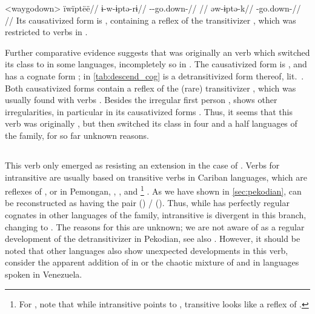 \pex<waygodown>\wayana \parencite[][200]{wayanatavares2005}
\begingl
\glpreamble ïwïptëë//
\gla ɨ-w-ɨptə-rɨ//
\glb {}--go.down-//
\glft {}//
\endgl
{}
\begingl
\gla əw-ɨptə-k//
\glb {}-go.down-//
\glft {}//
\endgl
\xe
%
Its causativized form is  \parencite[255]{wayanatavares2005}, containing a reflex of the transitivizer , which was restricted to  verbs in \PC \parencite{gildea2019overview}.

Further comparative evidence suggests that   was originally an  verb which switched its class to  in some languages, incompletely so in \wayana.
The \arara causativized form is  \parencite[66]{alves2017arara}, and \kalina has a cognate form  \parencite[263]{courtz2008carib};   in \cref{tab:descend_cog} is a detransitivized form thereof, lit.\ .
Both causativized forms contain a reflex of the (rare) transitivizer , which was usually found with  verbs \parencite{gildea2019overview}.
Besides the irregular first person , \trio {} shows other irregularities, in particular in its causativized forms \parencite[263]{triomeira1999}.
Thus, it seems that this verb was originally , but then switched its class in four and a half languages of the family, for so far unknown reasons.




\subsection{\PPek {} }
\label{sec:bathe}
This verb only emerged as resisting an extension in the case of \PPek {}.
Verbs for intransitive  are usually based on transitive verbs in Cariban languages, which are reflexes of , or  in Pemongan, \panare, \kalina, and \maqui\footnote{For \maqui, note that while intransitive  points to , transitive  looks like a reflex of .} .
As we have shown in \cref{sec:pekodian}, \PPek can be reconstructed as having the pair  () /  ().
Thus, while \PPek {} has perfectly regular cognates in other languages of the family, intransitive  is divergent in this branch, changing  to .
The reasons for this are unknown; we are not aware of  as a regular development of the detransitivizer in Pekodian, see also \textcite[506]{meira2010origin}.
However, it should be noted that other languages also show unexpected developments in this verb, consider the apparent addition of  in \hixka or the chaotic mixture of  and  in languages spoken in Venezuela.


